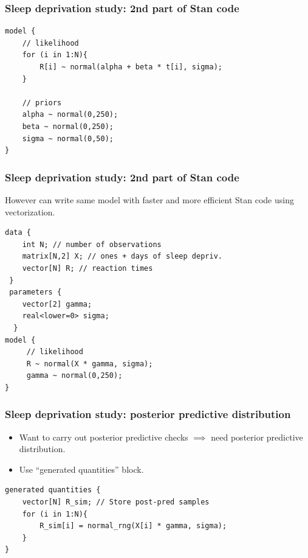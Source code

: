 \documentclass[handout]{beamer}
\begin{document}
\begin{frame}[fragile]
	\frametitle{Sleep deprivation study: 2nd part of Stan code}
	\begin{verbatim}
model {
    // likelihood
    for (i in 1:N){
        R[i] ~ normal(alpha + beta * t[i], sigma);
    }
    
    // priors
    alpha ~ normal(0,250);
    beta ~ normal(0,250);
    sigma ~ normal(0,50);
}
	\end{verbatim}
	
\end{frame}

\begin{frame}[fragile]
	\frametitle{Sleep deprivation study: 2nd part of Stan code}
    However can write same model with faster and more efficient Stan code using vectorization.
    
   	\begin{verbatim}
data {
    int N; // number of observations
    matrix[N,2] X; // ones + days of sleep depriv.
    vector[N] R; // reaction times
 } 
 parameters {
    vector[2] gamma;
    real<lower=0> sigma;
  } 
model {
     // likelihood
     R ~ normal(X * gamma, sigma);
     gamma ~ normal(0,250);
}
  	\end{verbatim}
    
\end{frame}

\begin{frame}[fragile]
	\frametitle{Sleep deprivation study: posterior predictive distribution}
	\begin{itemize}
		\item<2-> Want to carry out posterior predictive checks $\implies$ need posterior predictive distribution.
		\item<3-> Use ``generated quantities'' block.
	\end{itemize}

\begin{verbatim}
generated quantities {
    vector[N] R_sim; // Store post-pred samples
    for (i in 1:N){
        R_sim[i] = normal_rng(X[i] * gamma, sigma);
    }
}
\end{verbatim}
	
\end{frame}
\end{document}
